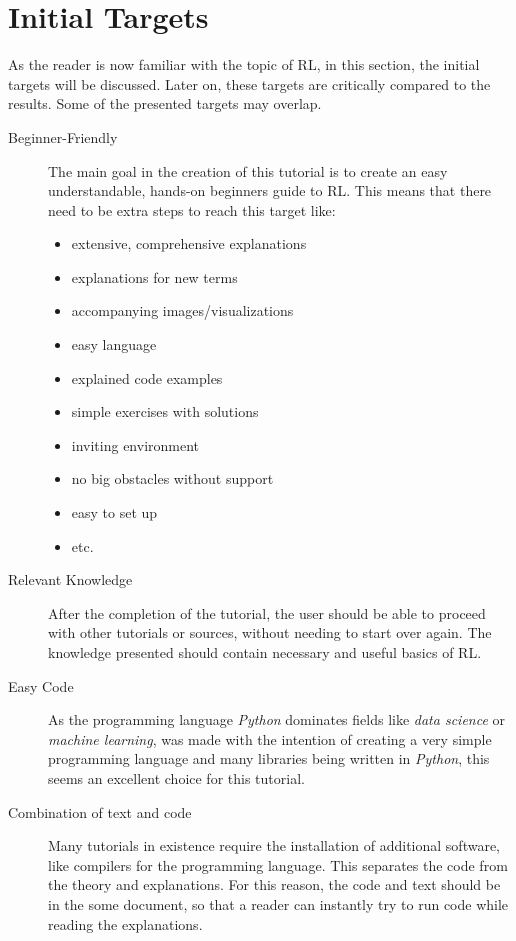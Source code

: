 \documentclass[a4paper]{article}
\begin{document}
	

	\section{Initial Targets}
		As the reader is now familiar with the topic of RL, in this section, the initial targets will be discussed. Later on, these targets are critically compared to the results. Some of the presented targets may overlap.
		
		\begin{description}
			\item[Beginner-Friendly] 	The main goal in the creation of this tutorial is to create an easy understandable, hands-on beginners guide to RL.
			This means that there need to be extra steps to reach this target like:
			\begin{itemize}
				\item extensive, comprehensive explanations
				\item explanations for new terms
				\item accompanying images/visualizations
				\item easy language
				\item explained code examples
				\item simple exercises with solutions
				\item inviting environment 
				\item no big obstacles without support
				\item easy to set up
				\item etc.
			\end{itemize}
		
			\item[Relevant Knowledge] After the completion of the tutorial, the user should be able to proceed with other tutorials or sources, without needing to start over again. The knowledge presented should contain necessary and useful basics of RL.
			
			\item[Easy Code] As the programming language \textit{Python} dominates fields like \textit{data science} or \textit{machine learning}, was made with the intention of creating a very simple programming language and many libraries being written in \textit{Python}, this seems an excellent choice for this tutorial.\\ 
			
			\item[Combination of text and code] Many tutorials in existence require the installation of additional software, like compilers for the programming language. This separates the code from the theory and explanations. For this reason, the code and text should be in the some document, so that a reader can instantly try to run code while reading the explanations. 
			

\end{description}
\end{document}
